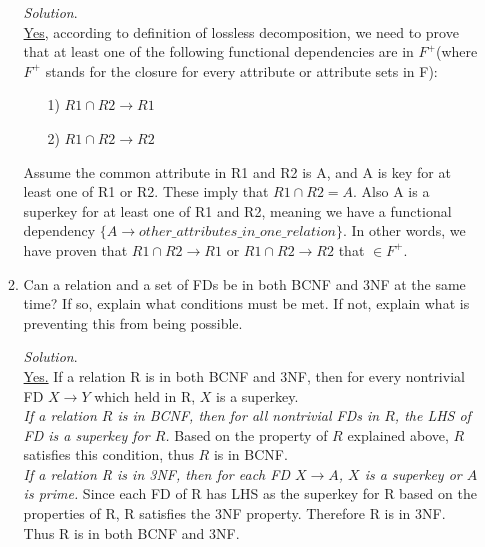 \documentclass[10pt]{article}
\begin{document}
\begin{enumerate}
\begin{enumerate}
              \begin{mdframed}[leftmargin=-6.5mm]
              \textit{Solution}.\\
              \underline{Yes,} according to definition of lossless decomposition, we need to prove that at least one of the following functional dependencies are in $F^+$(where $F^+$ stands for the closure for every attribute or attribute sets in F):\\
              \begin{itemize}
                  \item[1)] $R1 \cap R2 \to R1$
                  \item[2)] $R1 \cap R2 \to R2$
              \end{itemize}
              Assume the common attribute in R1 and R2 is A, and A is key for at least one of R1 or R2. These imply that $R1 \cap R2 = A$. Also A is a superkey for at least one of R1 and R2, meaning we have a functional dependency $\{A \to other\_attributes\_in\_one\_relation\}$. In other words, we have proven that $R1 \cap R2 \to R1$ or $R1 \cap R2 \to R2$ that $\in F^+$.
              \end{mdframed}
              
        \item Can a relation and a set of FDs be in both BCNF and 3NF at the same time? If so,            explain what conditions must be met. If not, explain what is preventing this from           being possible.
        
              \begin{mdframed}[leftmargin=-6.5mm]
              \textit{Solution}.\\
              \underline{Yes.} If a relation R is in both BCNF and 3NF, then for every nontrivial FD $X \rightarrow Y$ which held in R, $X$ is a superkey.\\
              \textit{If a relation $R$ is in BCNF, then for all nontrivial FDs in $R$, the LHS of FD is a superkey for $R$.} Based on the property of $R$ explained above, $R$ satisfies this condition, thus $R$ is in BCNF.\\
              \textit{If a relation R is in 3NF, then for each FD $X \rightarrow A$, $X$ is a superkey or $A$ is prime.} Since each FD of R has LHS as the superkey for R based on the properties of R, R satisfies the 3NF property. Therefore R is in 3NF.\\
              Thus R is in both BCNF and 3NF.
              \end{mdframed}
              

\end{enumerate}
\end{enumerate}
\end{document}
